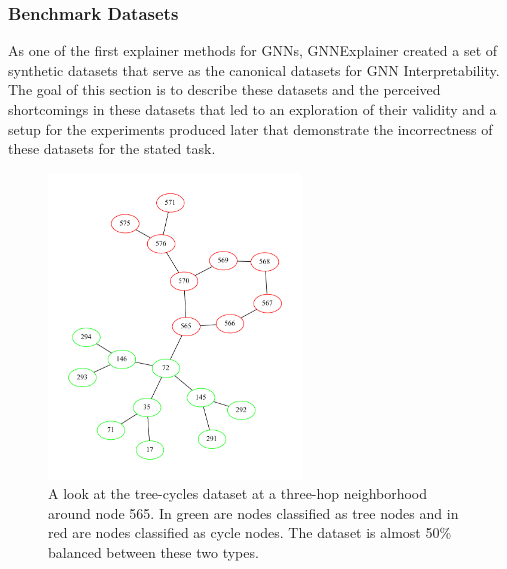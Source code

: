 \subsubsection{Benchmark Datasets}
\label{sec:benchmark-datasets}
As one of the first explainer methods for GNNs, GNNExplainer created a set of synthetic datasets that serve as the canonical datasets for GNN Interpretability. The goal of this section is to describe these datasets and the perceived shortcomings in these datasets that led to an exploration of their validity and a setup for the experiments produced later that demonstrate the incorrectness of these datasets for the stated task.
\begin{figure}[h]
	\centering
	\includegraphics[width=0.6\textwidth]{images/tree-cycles.pdf}
	\caption{A look at the tree-cycles dataset at a three-hop neighborhood around node 565. In green are nodes classified as tree nodes and in red are nodes classified as cycle nodes. The dataset is almost 50\% balanced between these two types.}
	\label{fig:tree-cycles}
\end{figure}

